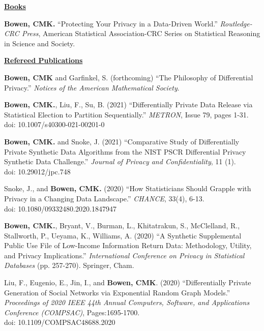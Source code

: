 \documentclass[11pt, letterpaper, roman]{moderncv} %
\begin{document}
\noindent\underline{\textbf{Books}}

\begin{etaremune}[topsep=0pt, itemsep=6pt, partopsep=0pt, parsep=0pt]
  \item \textbf{Bowen, CMK.} ``Protecting Your Privacy in a Data-Driven World.'' \textit{Routledge-CRC Press}, American Statistical Association-CRC Series on Statistical Reasoning in Science and Society.
\end{etaremune}

\vspace{4pt}
\noindent\underline{\textbf{Refereed Publications}}
\vspace{4pt}
\begin{etaremune}[topsep=0pt, itemsep=4pt, partopsep=0pt, parsep=0pt]
    \item \textbf{Bowen, CMK} and Garfinkel, S. (forthcoming) ``The Philosophy of Differential Privacy.'' \textit{Notices of the American Mathematical Society}.
    
    \item \textbf{Bowen, CMK.}, Liu, F., Su, B. (2021) ``Differentially Private Data Release via Statistical Election to Partition Sequentially.'' \textit{METRON}, Issue 79, pages 1-31.\\
    doi: 10.1007/s40300-021-00201-0
    
    \item \textbf{Bowen, CMK.} and Snoke, J. (2021) ``Comparative Study of Differentially Private Synthetic Data Algorithms from the NIST PSCR Differential Privacy Synthetic Data Challenge.'' \textit{Journal of Privacy and Confidentiality}, 11 (1).\\
    doi: 10.29012/jpc.748
    
    \item Snoke, J., and \textbf{Bowen, CMK.} (2020) ``How Statisticians Should Grapple with Privacy in a Changing Data Landscape.'' \textit{CHANCE}, 33(4), 6-13.\\
    doi: 10.1080/09332480.2020.1847947
    
    \item \textbf{Bowen, CMK.}, Bryant, V., Burman, L., Khitatrakun, S., McClelland, R., Stallworth, P., Ueyama, K., Williams, A. (2020) ``A Synthetic Supplemental Public Use File of Low-Income Information Return Data: Methodology, Utility, and Privacy Implications.'' \textit{International Conference on Privacy in Statistical Databases} (pp. 257-270). Springer, Cham.
    
    \item Liu, F., Eugenio, E., Jin, I., and \textbf{Bowen, CMK}. (2020) ``Differentially Private Generation of Social Networks via Exponential Random Graph Models.'' \textit{Proceedings of 2020 IEEE 44th Annual Computers, Software, and Applications Conference (COMPSAC)}, Pages:1695-1700.\\
    doi: 10.1109/COMPSAC48688.2020


\end{etaremune}
\end{document}
